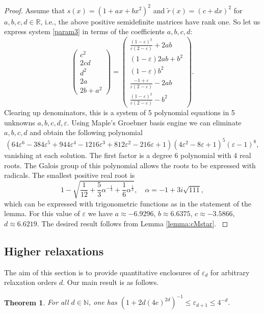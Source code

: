 \documentclass[a4paper,12pt]{article}
\newcommand{\R}{\mathbb{R}} %
\newtheorem{theorem}{Theorem}
\newcommand{\NN}{\mathbb{N}}
\begin{document}
\begin{proof}
Assume that $s(x)=(1+ax+bx^2)^2$ and ${\tilde{r}}(x)=(c+dx)^2$ for $a,b,c,d \in \R$, i.e., the above positive semidefinite matrices have rank one. So let us express system \eqref{param3} in terms of the coefficients $a,b,c,d$:
\[
\left(\begin{array}{c}
c^2 \\ 2cd \\ d^2 \\ \hline 2a  \\ 2b+a^2
\end{array}\right)
=
\left(\begin{array}{c}
\frac{(1-\varepsilon)^3}{\varepsilon(2-\varepsilon)} + 2ab \\ (1-\varepsilon)2ab + b^2 \\ (1-\varepsilon)b^2 \\ \hline \frac{-1+\varepsilon}{\varepsilon(2-\varepsilon)} - 2ab \\ \frac{(1-\varepsilon)^2}{\varepsilon(2-\varepsilon)} - b^2
\end{array}\right).
\]
Clearing up denominators, this is a system of 5 polynomial equations in 5 unknowns $a,b,c,d,\varepsilon$. Using Maple's Groebner basis engine we can eliminate $a,b,c,d$ and obtain the following polynomial
\[
(64\varepsilon^6 - 384\varepsilon^5 + 944\varepsilon^4 - 1216\varepsilon^3 + 812\varepsilon^2 - 216\varepsilon + 1)(4\varepsilon^2 - 8\varepsilon + 1)^5(\varepsilon - 1)^8,
\]
vanishing at each solution. The first factor is 
a degree 6 polynomial with 4 real roots. The Galois group of this polynomial allows the roots to be expressed with radicals. The smallest positive real root is
\[
1-\sqrt{ \frac{1}{12} + \frac{5}{3}\alpha^{-\frac{1}{3}} + \frac{1}{6}\alpha^{\frac{1}{3}}},\quad \alpha = -1+3i\sqrt{111} ,
\]
which can be expressed with trigonometric functions as in the statement of the lemma. For this value of $\varepsilon$ we have $a \approx -6.9296$, $b \approx 6.6375$, $c \approx -3.5866$, $d \approx 6.6219$. 
{The desired result follows from Lemma \ref{lemma:cMstar}. }
\end{proof}


\subsection{Higher relaxations}
\label{sec:higher}
The aim of this section is to provide quantitative enclosures of $\varepsilon_d$ for arbitrary relaxation orders $d$. 
Our main result is as follows. 
%
\begin{theorem}
\label{th:bounds}
For all $d \in \NN$, one has 
$(1+2d (4 e)^{2d})^{-1}  \leq \varepsilon_{d+1} \leq 4^{-d}$.
\end{theorem}
\end{document}
